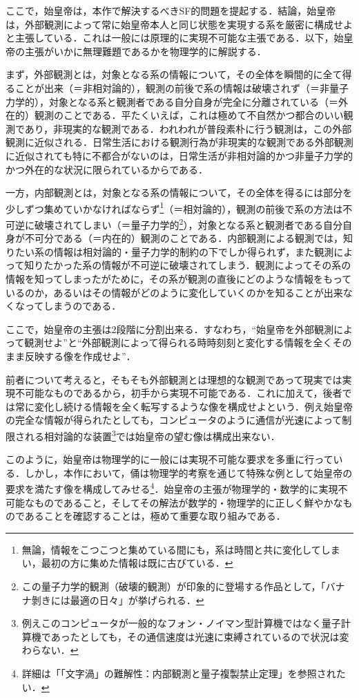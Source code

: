 \documentclass[10pt, a5paper, twoside]{jsarticle}
\theoremstyle{definition}
\begin{document}
		ここで，始皇帝は，本作で解決するべきSF的問題を提起する．結論，始皇帝は，外部観測によって常に始皇帝本人と同じ状態を実現する系を厳密に構成せよと主張している．これは一般には原理的に実現不可能な主張である．以下，始皇帝の主張がいかに無理難題であるかを物理学的に解説する．

		まず，外部観測とは，対象となる系の情報について，その全体を瞬間的に全て得ることが出来（＝非相対論的），観測の前後で系の情報は破壊されず（＝非量子力学的），対象となる系と観測者である自分自身が完全に分離されている（＝外在的）観測のことである．平たくいえば，これは極めて不自然かつ都合のいい観測であり，非現実的な観測である．われわれが普段素朴に行う観測は，この外部観測に近似される．日常生活における観測行為が非現実的な観測である外部観測に近似されても特に不都合がないのは，日常生活が非相対論的かつ非量子力学的かつ外在的な状況に限られているからである．

		一方，内部観測とは，対象となる系の情報について，その全体を得るには部分を少しずつ集めていかなければならず\footnote{無論，情報をこつこつと集めている間にも，系は時間と共に変化してしまい，最初の方に集めた情報は既に古びている．}（＝相対論的），観測の前後で系の方法は不可逆に破壊されてしまい（＝量子力学的\footnote{この量子力学的観測（破壊的観測）が印象的に登場する作品として，「バナナ剝きには最適の日々」が挙げられる．}），対象となる系と観測者である自分自身が不可分である（＝内在的）観測のことである．内部観測による観測では，知りたい系の情報は相対論的・量子力学的制約の下でしか得られず，また観測によって知りたかった系の情報が不可逆に破壊されてしまう．観測によってその系の情報を知ってしまったがために，その系が観測の直後にどのような情報をもっているのか，あるいはその情報がどのように変化していくのかを知ることが出来なくなってしまうのである．

		ここで，始皇帝の主張は2段階に分割出来る．すなわち，“始皇帝を外部観測によって観測せよ”と“外部観測によって得られる時時刻刻と変化する情報を全くそのまま反映する像を作成せよ”．

		前者について考えると，そもそも外部観測とは理想的な観測であって現実では実現不可能なものであるから，初手から実現不可能である．これに加えて，後者では常に変化し続ける情報を全く転写するような像を構成せよという．例え始皇帝の完全な情報が得られたとしても，コンピュータのように通信が光速によって制限される相対論的な装置\footnote{例えこのコンピュータが一般的なフォン・ノイマン型計算機ではなく量子計算機であったとしても，その通信速度は光速に束縛されているので状況は変わらない．}では始皇帝の望む像は構成出来ない．

		このように，始皇帝は物理学的に一般には実現不可能な要求を多重に行っている．しかし，本作において，俑は物理学的考察を通じて特殊な例として始皇帝の要求を満たす像を構成してみせる\footnote{詳細は「「文字渦」の難解性：内部観測と量子複製禁止定理」\cite{sshimo1}を参照されたい．}．始皇帝の主張が物理学的・数学的に実現不可能なものであること，そしてその解法が数学的・物理学的に正しく鮮やかなものであることを確認することは，極めて重要な取り組みである．
\end{document}
